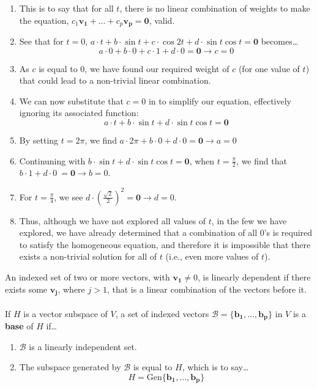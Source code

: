 \documentclass[12pt]{article}
\newcommand{\gen}[1]{\mathrm{Gen}\{{#1}\}}
\newcommand{\bt}[1]{\textbf{{#1}}}
\newcommand{\bm}[1]{\mathbf{{#1}}}
\begin{document}
\begin{enumerate}
    \item This is to say that for all $t$, there is no linear combination of weights to make the equation, $c_1\bm{v_1} + \dots + c_p\bm{v_p} = \bm{0}$, valid.
    \item See that for $t = 0$, $a\cdot t + b\cdot \sin t + c\cdot \cos 2t + d\cdot \sin t \cos t = \bm{0}$ becomes\dots
    $$a\cdot 0 + b\cdot 0 + c\cdot 1 + d\cdot 0 = \bm{0} \rightarrow c = 0$$
    \item As $c$ is equal to 0, we have found our required weight of $c$ (for one value of $t$) that could lead to a non-trivial linear combination.
    \item We can now substitute that $c = 0$ in to simplify our equation, effectively ignoring its associated function:
    $$a\cdot t + b\cdot \sin t + d\cdot \sin t \cos t = \bm{0}$$
    \item By setting $t = 2\pi$, we find $a\cdot 2\pi + b\cdot 0 + d\cdot 0 = \bm{0} \rightarrow a = 0$
    \item Continuning with $ b\cdot \sin t + d\cdot \sin t \cos t = \bm{0}$, when $t = \frac{\pi}{2}$, we find that  $b\cdot 1 + d\cdot 0 \ = \bm{0} \rightarrow b = 0$.
    \item For $t = \frac{\pi}{4}$, we see $d \cdot (\frac{\sqrt{2}}{2})^2 = \bm{0} \rightarrow d = 0$.
    \item Thus, although we have not explored all values of $t$, in the few we have explored, we have already determined that a combination of all $0$'s is required to satisfy
    the homogeneous equation, and therefore it is impossible that there exists a non-trivial solution for all of $t$ (i.e., even more values of $t$).
\end{enumerate}

An indexed set of two or more vectors, with $\bm{v_1} \neq 0$, is linearly dependent if there exists some $\bm{v_j}$, where $j > 1$, that is a linear combination
of the vectors before it. \\ \\

If $H$ is a vector subspace of $V$, a set of indexed vectors $\mathcal{B} = \{\bm{b_1},\dots,\bm{b_p}\}$ in $V$ is a \bt{base} of $H$ if\dots

\begin{enumerate}
    \item $\mathcal{B}$ is  a linearly independent set.
    \item The subspace generated by $\mathcal{B}$ is equal to $H$, which is to say\dots
    $$H = \gen{\bm{b_1,\dots,b_p}}$$
\end{enumerate}
\end{document}
